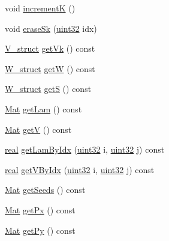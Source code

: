 \begin{DoxyCompactItemize}
\item 
void \mbox{\hyperlink{classvd_a59c1f5756af7de9cc7a0089221cbd5b7}{incrementK}} ()
\item 
void \mbox{\hyperlink{classvd_ab5a972992406d5c42d1398573d9c769a}{erase\+Sk}} (\mbox{\hyperlink{typedefs_8cpp_a8ad23e2333787a214e20a58a284a5a60}{uint32}} idx)
\item 
\mbox{\hyperlink{structV__struct}{V\+\_\+struct}} \mbox{\hyperlink{classvd_a090bebdbbff36888934c870daf3dcb36}{get\+Vk}} () const
\item 
\mbox{\hyperlink{structW__struct}{W\+\_\+struct}} \mbox{\hyperlink{classvd_ab4d0d9ea76cedf1a6825b62c9ec2d118}{getW}} () const
\item 
\mbox{\hyperlink{structW__struct}{W\+\_\+struct}} \mbox{\hyperlink{classvd_a7f901e0c6d226b81f262c2363a69844a}{getS}} () const
\item 
\mbox{\hyperlink{typedefs_8cpp_a9fa28c1f74e909474857584f5c7b0088}{Mat}} \mbox{\hyperlink{classvd_a37c4ab12669eb276fe7fa4a610310345}{get\+Lam}} () const
\item 
\mbox{\hyperlink{typedefs_8cpp_a9fa28c1f74e909474857584f5c7b0088}{Mat}} \mbox{\hyperlink{classvd_aad4ea5c045b8380f83b0490af2fee0fa}{getV}} () const
\item 
\mbox{\hyperlink{typedefs_8cpp_a58a0c7cf2501f4492da833421be92547}{real}} \mbox{\hyperlink{classvd_a5c26b069f893aa82eeaf53ff608eda1f}{get\+Lam\+By\+Idx}} (\mbox{\hyperlink{typedefs_8cpp_a8ad23e2333787a214e20a58a284a5a60}{uint32}} i, \mbox{\hyperlink{typedefs_8cpp_a8ad23e2333787a214e20a58a284a5a60}{uint32}} j) const
\item 
\mbox{\hyperlink{typedefs_8cpp_a58a0c7cf2501f4492da833421be92547}{real}} \mbox{\hyperlink{classvd_a640ed20e4618abd409e180a707eea3b1}{get\+V\+By\+Idx}} (\mbox{\hyperlink{typedefs_8cpp_a8ad23e2333787a214e20a58a284a5a60}{uint32}} i, \mbox{\hyperlink{typedefs_8cpp_a8ad23e2333787a214e20a58a284a5a60}{uint32}} j) const
\item 
\mbox{\hyperlink{typedefs_8cpp_a9fa28c1f74e909474857584f5c7b0088}{Mat}} \mbox{\hyperlink{classvd_a82f353c594c3c6b24f6077398f059d3a}{get\+Seeds}} () const
\item 
\mbox{\hyperlink{typedefs_8cpp_a9fa28c1f74e909474857584f5c7b0088}{Mat}} \mbox{\hyperlink{classvd_aeba6d318016c8f8b9537ce4c0314f8cd}{get\+Px}} () const
\item 
\mbox{\hyperlink{typedefs_8cpp_a9fa28c1f74e909474857584f5c7b0088}{Mat}} \mbox{\hyperlink{classvd_a9738711704b1d03cdbe027b1976cb0c6}{get\+Py}} () const
\item 

\end{DoxyCompactItemize}
